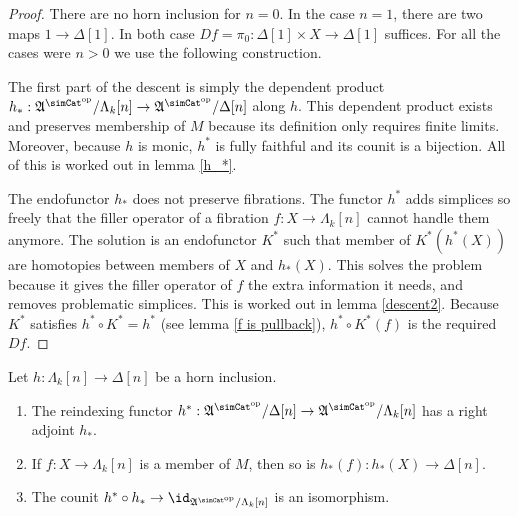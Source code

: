\documentclass{tac}
\newcommand\ri{^*}
\newcommand\dual{^{\mathrm{op}}}
\newcommand\s{^{\simCat\dual}}
\newcommand\of{:}
\newcommand\simplex\Delta
\newcommand\horn\Lambda
\newcommand\ambient{\mathfrak A}
\begin{document}
\newcommand\hornInclusion[2]{h^{#1}_{#2}}

\begin{proof} There are no horn inclusion for $n=0$. In the case $n=1$, there are two maps $1\to\simplex[1]$. In both case $Df=\pi_0\of \simplex[1]\times X \to\simplex[1]$ suffices. For all the cases were $n>0$ we use the following construction.

The first part of the descent is simply the dependent product $h_*\of \ambient\s/\horn_k[n]\to \ambient\s/\simplex[n]$ along $h$. This dependent product exists and preserves membership of $M$ because its definition only requires finite limits. Moreover, because $h$ is monic, $h^*$ is fully faithful and its counit is a bijection. All of this is worked out in lemma \ref{h_*}. 

The endofunctor $h_*$ does not preserve fibrations. The functor $h\ri$ adds simplices so freely that the filler operator of a fibration $f\of X\to \horn_k[n]$ cannot handle them anymore. The solution is an endofunctor $K\ri$ such that member of $K\ri(h^*(X))$ are homotopies between members of $X$ and $h_*(X)$. This solves the problem because it gives the filler operator of $f$ the extra information it needs, and removes problematic simplices. This is worked out in lemma \ref{descent2}. Because $K\ri$ satisfies $h\ri\circ K\ri = h\ri$ (see lemma \ref{f is pullback}), $h\ri\circ K\ri(f)$ is the required $Df$.
\end{proof}


\begin{lemma} Let $h\of \horn_k[n]\to \simplex[n]$ be a horn inclusion.
\begin{enumerate}
\item The reindexing functor $h\ri\of\ambient\s/\simplex[n]\to\ambient\s/\horn_k[n]$ has a right adjoint $h_*$.
\item If $f\of X\to \horn_k[n]$ is a member of $M$, then so is $h_*(f)\of h_*(X)\to \simplex[n]$.
\item The counit $h\ri\circ h_*\to\id_{\ambient\s/\horn_k[n]}$ is an isomorphism.
\end{enumerate}\label{h_*} 
\end{lemma}
\end{document}
